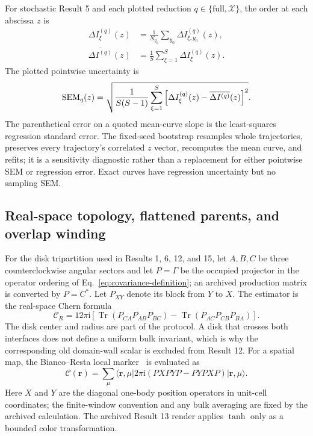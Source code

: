 \documentclass[aps,prb,twocolumn,floatfix,nofootinbib,superscriptaddress]{revtex4-2}
\newcommand{\Tr}{\operatorname{Tr}}
\newcommand{\ii}{\mathrm{i}}
\begin{document}
For stochastic Result 5 and each plotted reduction
$q\in\{\mathrm{full},\mathcal X\}$, the order at each abscissa $z$ is
\begin{equation}
 \begin{aligned}
 \Delta I_\xi^{(q)}(z)
 &=\frac1{N_{y_0}}\sum_{y_0}\Delta I_{\xi,y_0}^{(q)}(z),\\
 \overline{\Delta I^{(q)}}(z)
 &=\frac1S\sum_{\xi=1}^{S}\Delta I_\xi^{(q)}(z).
 \end{aligned}
 \label{eq:tmi-averaging}
\end{equation}
The plotted pointwise uncertainty is
\begin{equation}
 {\rm SEM}_q(z)=
 \sqrt{\frac{1}{S(S-1)}
 \sum_{\xi=1}^{S}\left[\Delta I_\xi^{(q)}(z)
 -\overline{\Delta I^{(q)}}(z)\right]^2}.
 \label{eq:tmi-sem}
\end{equation}
The parenthetical error on a quoted mean-curve slope is the least-squares regression
standard error.  The fixed-seed bootstrap resamples whole trajectories, preserves every
trajectory's correlated $z$ vector, recomputes the mean curve, and refits; it is a
sensitivity diagnostic rather than a replacement for either pointwise SEM or regression
error.  Exact curves have regression uncertainty but no sampling SEM.

\subsection{Real-space topology, flattened parents, and overlap winding}
\label{app:topology-formalism}

For the disk tripartition used in Results 1, 6, 12, and 15, let $A,B,C$ be three
counterclockwise angular sectors and let $P=\Gamma$ be the occupied projector in the
operator ordering of Eq.~\eqref{eq:covariance-definition}; an archived production matrix
is converted by $P=C^*$.  Let $P_{XY}$ denote its block from $Y$ to $X$.  The estimator
is the real-space Chern
formula~\cite{Kitaev2006}
\begin{equation}
 \mathcal C_R=12\pi\ii\left[
 \Tr(P_{CA}P_{AB}P_{BC})
 -\Tr(P_{AC}P_{CB}P_{BA})\right].
 \label{eq:atlas-tripartition-chern}
\end{equation}
The disk center and radius are part of the protocol.  A disk that crosses both interfaces
does not define a uniform bulk invariant, which is why the corresponding old domain-wall
scalar is excluded from Result 12.  For a spatial map, the Bianco--Resta local
marker~\cite{BiancoResta2011} is evaluated as
\begin{equation}
 \mathcal C(\boldsymbol r)=
 \sum_{\mu}\langle\boldsymbol r,\mu|
 2\pi\ii(PXPYP-PYPXP)|\boldsymbol r,\mu\rangle .
 \label{eq:atlas-local-chern}
\end{equation}
Here $X$ and $Y$ are the diagonal one-body position operators in unit-cell coordinates;
the finite-window convention and any bulk averaging are fixed by the archived calculation.
The archived Result 13 render applies $\tanh$ only as a bounded color transformation.
\end{document}
